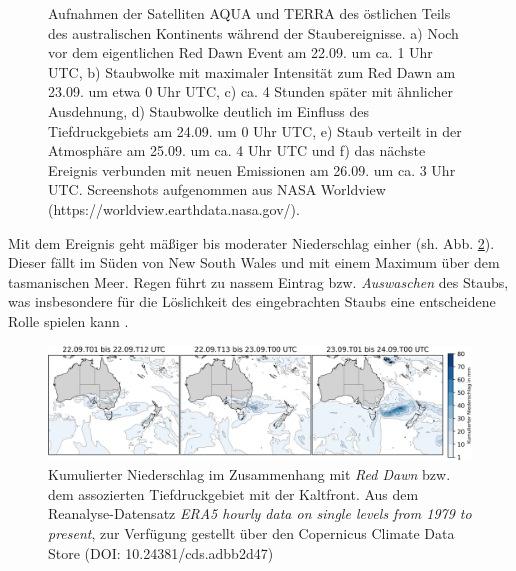 \documentclass[12pt,a4paper,onecolumn]{scrartcl}
\begin{document}
\begin{figure}
\begin{minipage}[c]{0.32\textwidth}
	\end{minipage}\hfill
\caption{Aufnahmen der Satelliten AQUA und TERRA des östlichen Teils des australischen Kontinents während der Staubereignisse. a) Noch vor dem eigentlichen Red Dawn Event am 22.09. um ca. 1 Uhr UTC, b) Staubwolke mit maximaler Intensität zum Red Dawn am 23.09. um etwa 0 Uhr UTC, c) ca. 4 Stunden später mit ähnlicher Ausdehnung, d) Staubwolke deutlich im Einfluss des Tiefdruckgebiets am 24.09. um 0 Uhr UTC, e) Staub verteilt in der Atmosphäre am 25.09. um ca. 4 Uhr UTC und f) das nächste Ereignis verbunden mit neuen Emissionen am 26.09. um ca. 3 Uhr UTC.  Screenshots aufgenommen aus NASA Worldview (https://worldview.earthdata.nasa.gov/).} \label{fig:satellite}
\end{figure}
Mit dem Ereignis geht mäßiger bis moderater Niederschlag einher (sh. Abb.  \ref{fig:rain}). Dieser fällt im Süden von New South Wales und mit einem Maximum über dem tasmanischen Meer. Regen führt zu nassem Eintrag bzw. \textit{Auswaschen} des Staubs, was insbesondere für die Löslichkeit des eingebrachten Staubs eine entscheidene Rolle spielen kann \citep{Gabric.2016}. 
\begin{figure}
\includegraphics[width=\textwidth]{bilder/reddawn/rain.png}
\caption{Kumulierter Niederschlag im Zusammenhang mit \textit{Red Dawn} bzw. dem assozierten Tiefdruckgebiet mit der Kaltfront. Aus dem Reanalyse-Datensatz \textit{ERA5 hourly data on single levels from 1979 to present}, zur Verfügung gestellt über den Copernicus Climate Data Store (DOI: 10.24381/cds.adbb2d47) } \label{fig:rain}
\end{figure}
\end{document}
